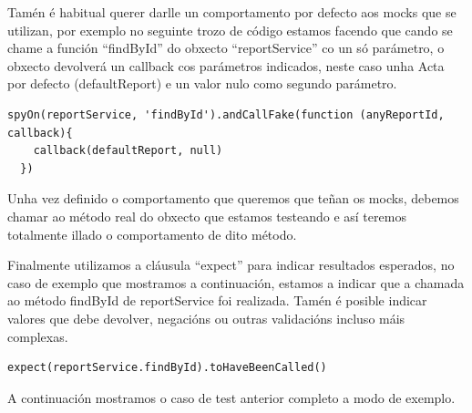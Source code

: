     Tamén é habitual querer darlle un comportamento por defecto aos mocks que 
se utilizan, por exemplo no seguinte trozo de código estamos facendo que cando 
se chame a función ``findById'' do obxecto ``reportService''  co un só 
parámetro, o obxecto devolverá un callback cos parámetros indicados, neste 
caso unha Acta por defecto (defaultReport) e un valor nulo como segundo 
parámetro.

    \begin{lstlisting}[frame=single]
  spyOn(reportService, 'findById').andCallFake(function (anyReportId, callback){
    callback(defaultReport, null)
  })
    \end{lstlisting}

    Unha vez definido o comportamento que queremos que teñan os mocks, debemos 
chamar ao método real do obxecto que estamos testeando e así teremos totalmente 
illado o comportamento de dito método.

    Finalmente utilizamos a cláusula ``expect'' para indicar resultados 
esperados, no caso de exemplo que mostramos a continuación, estamos a indicar 
que a chamada ao método findById de reportService foi realizada. Tamén é 
posible indicar valores que debe devolver, negacións ou outras validacións 
incluso máis complexas.

    \begin{lstlisting}[frame=single]
      expect(reportService.findById).toHaveBeenCalled()
    \end{lstlisting}

    A continuación mostramos o caso de test anterior completo a modo de exemplo.

